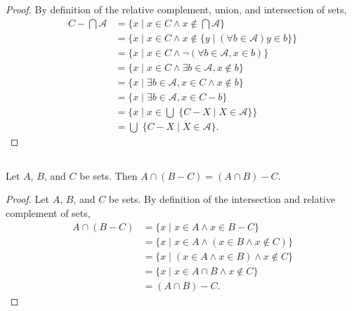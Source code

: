 \documentclass{report}
\begin{document}
\begin{proof}
    By definition of the relative complement, union, and intersection of sets,
      \begin{align*}
        C - \bigcap \mathscr{A}
          & = \{ x \mid x \in C \land x \not\in \bigcap \mathscr{A} \} \\
          & = \{ x \mid x \in C \land
            x \not\in \{ y \mid (\forall b \in \mathscr{A}) y \in b \}\} \\
          & = \{ x \mid x \in C \land
            \neg(\forall b \in \mathscr{A}, x \in b) \} \\
          & = \{ x \mid x \in C \land
            \exists b \in \mathscr{A}, x \not\in b \} \\
          & = \{ x \mid
            \exists b \in \mathscr{A}, x \in C \land x \not\in b \} \\
          & = \{ x \mid \exists b \in \mathscr{A}, x \in C - b \} \\
          & = \{ x \mid x \in \bigcup\; \{ C - X \mid X \in \mathscr{A} \} \} \\
          & = \bigcup\; \{ C - X \mid X \in \mathscr{A} \}.
      \end{align*}

\end{proof}

\subsection{}%
\label{sub:intersection-difference-associativity}

Let $A$, $B$, and $C$ be sets.
Then $A \cap (B - C) = (A \cap B) - C$.

\begin{proof}


  Let $A$, $B$, and $C$ be sets.
  By definition of the intersection and relative complement of sets,
    \begin{align*}
      A \cap (B - C)
        & = \{ x \mid x \in A \land x \in B - C \} \\
        & = \{ x \mid x \in A \land (x \in B \land x \not\in C) \} \\
        & = \{ x \mid (x \in A \land x \in B) \land x \not\in C \} \\
        & = \{ x \mid x \in A \cap B \land x \not \in C \} \\
        & = (A \cap B) - C.
    \end{align*}

\end{proof}
\end{document}
